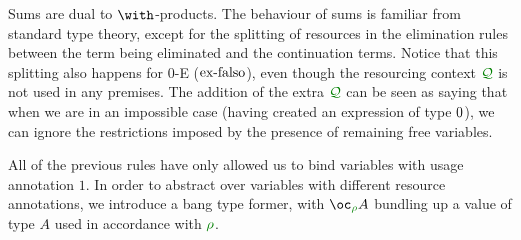 Sums are dual to $\withT{}{}$-products.
The behaviour of sums is familiar from standard type theory, except for the
splitting of resources in the elimination rules between the term being
eliminated and the continuation terms.
Notice that this splitting also happens for $0$-E ($\operatorname{ex-falso}$), even though the
resourcing context $\resctx Q$ is not used in any premises.
The addition of the extra $\resctx Q$ can be seen as saying that when we are in
an impossible case (having created an expression of type $0$), we can
ignore the restrictions imposed by the presence of remaining free variables.


All of the previous rules have only allowed us to bind variables with usage
annotation $1$.
In order to abstract over variables with different resource annotations, we
introduce a bang type former, with $\excl{\rho}{A}$ bundling up a value of type
$A$ used in accordance with $\rescomment \rho$.


